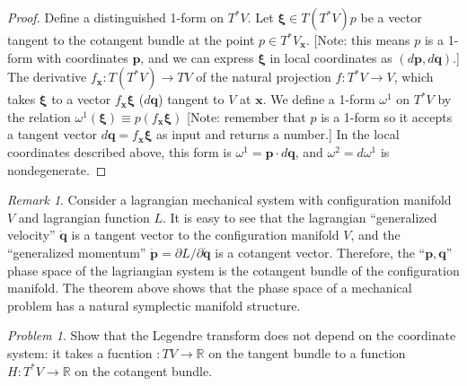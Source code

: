 \documentclass{book}
\numberwithin{equation}{section}
\theoremstyle{plain}
\theoremstyle{definition}
\theoremstyle{remark}
\newtheorem*{rem*}{Remark}
\theoremstyle{remark}
\newtheorem*{prob*}{Problem}
\begin{document}
\begin{proof}
Define a distinguished 1-form on $T^*V$.
%
Let $\pmb \xi \in T(T^*V)p$ be a vector tangent to the cotangent bundle at
the point $p \in T^*V_{\mathbf x}$.
[Note: this means $p$ is a 1-form with coordinates $\mathbf p$,
and we can express $\pmb \xi$ in local coordinates as $(d\mathbf p, d\mathbf q)$.]
%
The derivative $f_{\mathbf x}: T(T^*V) \rightarrow TV$
of the natural projection $f: T^*V \rightarrow V$,
which takes $\pmb \xi$ to a vector $f_{\mathbf x} \pmb \xi$ ($d\mathbf q$)
tangent to $V$ at $\mathbf x$.
%
We define a 1-form $\omega^1$ on $T^*V$ by the relation
$\omega^1(\pmb \xi) \equiv p( f_{\mathbf x}\pmb \xi )$
[Note: remember that $p$ is a 1-form so it accepts
  a tangent vector $d\mathbf q = f_{\mathbf x} \pmb \xi$
as input and returns a number.]
%
In the local coordinates described above,
this form is
$\omega^1 = \mathbf p \cdot d\mathbf q$,
and
$\omega^2 = d\omega^1$ is nondegenerate.
\end{proof}

\begin{rem*}
Consider a lagrangian mechanical system with configuration manifold $V$
and lagrangian function $L$.
It is easy to see that the lagrangian ``generalized velocity''
$\dot{\mathbf q}$ is a tangent vector to the configuration manifold $V$,
and the ``generalized momentum''
$\dot{\mathbf p} = \partial L/\partial \dot{\mathbf q}$
is a cotangent vector.
Therefore, the ``$\mathbf p, \mathbf q$'' phase space of the lagriangian
system is the cotangent bundle of the configuration manifold.
The theorem above shows that the phase space of a mechanical problem
has a natural symplectic manifold structure.
\end{rem*}

\begin{prob*}
  Show that the Legendre transform does not depend on the coordinate system:
  it takes a fucntion $:TV \rightarrow \mathbb R$ on the tangent bundle
  to a function $H: T^*V \rightarrow \mathbb R$ on the cotangent bundle.


\end{prob*}
\end{document}
